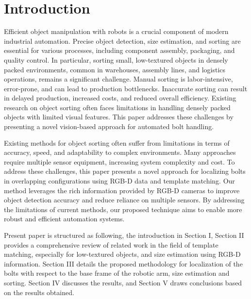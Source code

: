 \documentclass[conference]{IEEEtran}
\begin{document}
\section{Introduction}
Efficient object manipulation with robots is a crucial component of modern industrial automation. Precise object detection, size estimation, and sorting are essential for various processes, including component assembly, packaging, and quality control. In particular, sorting small, low-textured objects in densely packed environments, common in warehouses, assembly lines, and logistics operations, remains a significant challenge. Manual sorting is labor-intensive, error-prone, and can lead to production bottlenecks. Inaccurate sorting can result in delayed production, increased costs, and reduced overall efficiency. Existing research on object sorting often faces limitations in handling densely packed objects with limited visual features. This paper addresses these challenges by presenting a novel vision-based approach for automated bolt handling. 

 
Existing methods for object sorting often suffer from limitations in terms of accuracy, speed, and adaptability to complex environments. Many approaches require multiple sensor equipment, increasing system complexity and cost. To address these challenges, this paper presents a novel approach for localizing bolts in overlapping configurations using RGB-D data and template matching. Our method leverages the rich information provided by RGB-D cameras to improve object detection accuracy and reduce reliance on multiple sensors. By addressing the limitations of current methods, our proposed technique aims to enable more robust and efficient automation systems.

Present paper is structured as following, the introduction in Section I, Section II provides a comprehensive review of related work in the field of template matching, especially for low-textured objects, and size estimation using RGB-D information. Section III details the proposed methodology for localization of the bolts with respect to the base frame of the robotic arm, size estimation and sorting. Section IV discusses the results, and Section V draws conclusions based on the results obtained.
\end{document}

